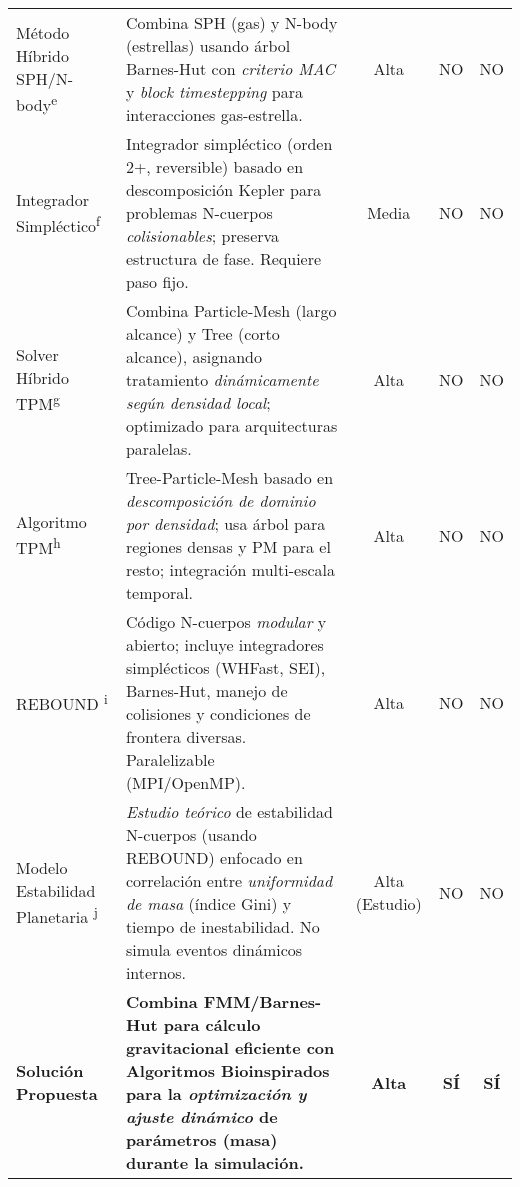 \begin{ThreePartTable}
\begin{longtable}{@{}p{0.8\firstcolwidth}p{0.6\desccolwidth}ccc@{}}
    \addlinespace[3pt]
    Método Híbrido SPH/N-body\textsuperscript{e}
    & Combina SPH (gas) y N-body (estrellas) usando árbol Barnes-Hut con \textit{criterio MAC} y \textit{block timestepping} para interacciones gas-estrella.
    & Alta
    & NO
    & NO \\

    \addlinespace[3pt]
    Integrador Simpléctico\textsuperscript{f}
    & Integrador simpléctico (orden 2+, reversible) basado en descomposición Kepler para problemas N-cuerpos \textit{colisionables}; preserva estructura de fase. Requiere paso fijo.
    & Media
    & NO
    & NO \\

    \addlinespace[3pt]
    Solver Híbrido TPM\textsuperscript{g}
    & Combina Particle-Mesh (largo alcance) y Tree (corto alcance), asignando tratamiento \textit{dinámicamente según densidad local}; optimizado para arquitecturas paralelas.
    & Alta
    & NO
    & NO \\

    \addlinespace[3pt]
    Algoritmo TPM\textsuperscript{h}
    & Tree-Particle-Mesh basado en \textit{descomposición de dominio por densidad}; usa árbol para regiones densas y PM para el resto; integración multi-escala temporal.
    & Alta
    & NO
    & NO \\

    \addlinespace[3pt]
    REBOUND \textsuperscript{i}
    & Código N-cuerpos \textit{modular} y abierto; incluye integradores simplécticos (WHFast, SEI), Barnes-Hut, manejo de colisiones y condiciones de frontera diversas. Paralelizable (MPI/OpenMP).
    & Alta
    & NO
    & NO \\

    \addlinespace[3pt]
    Modelo Estabilidad Planetaria \textsuperscript{j}
    & \textit{Estudio teórico} de estabilidad N-cuerpos (usando REBOUND) enfocado en correlación entre \textit{uniformidad de masa} (índice Gini) y tiempo de inestabilidad. No simula eventos dinámicos internos.
    & Alta (Estudio)
    & NO
    & NO \\

    \midrule
    \textbf{Solución Propuesta}
    & \textbf{Combina FMM/Barnes-Hut para cálculo gravitacional eficiente con Algoritmos Bioinspirados para la \textit{optimización y ajuste dinámico} de parámetros (masa) durante la simulación.}
    & \textbf{Alta}
    & \textbf{SÍ}
    & \textbf{SÍ} \\

\end{longtable}
\end{ThreePartTable}